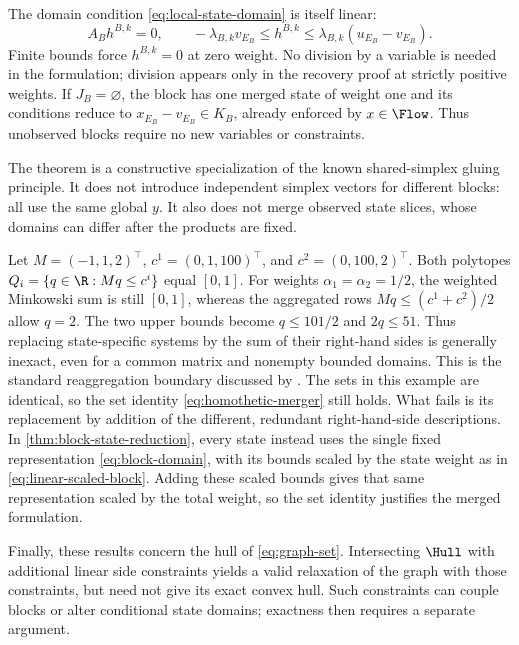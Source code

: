 The domain condition \eqref{eq:local-state-domain} is itself linear:
\begin{equation}\label{eq:linear-scaled-block}
 A_Bh^{B,k}=0,\qquad
 -\lambda_{B,k}v_{E_B}\le h^{B,k}
       \le\lambda_{B,k}(u_{E_B}-v_{E_B}).
\end{equation}
Finite bounds force $h^{B,k}=0$ at zero weight. No division by a variable is
needed in the formulation; division appears only in the recovery proof at
strictly positive weights. If $J_B=\varnothing$, the block has one merged
state of weight one and its conditions reduce to $x_{E_B}-v_{E_B}\in K_B$,
already enforced by $x\in\Flow$. Thus unobserved blocks require no new
variables or constraints.

The theorem is a constructive specialization of the known shared-simplex
gluing principle. It does not introduce independent simplex vectors for
different blocks: all use the same global $y$. It also does not merge
observed state slices, whose domains can differ after the products are fixed.

\begin{example}\label{ex:merger-boundary}
Let $M=(-1,1,2)^\top$, $c^1=(0,1,100)^\top$, and
$c^2=(0,100,2)^\top$. Both polytopes
$Q_i=\{q\in\R:Mq\le c^i\}$ equal $[0,1]$.
For weights $\alpha_1=\alpha_2=1/2$, the weighted Minkowski sum is still
$[0,1]$, whereas the aggregated rows
$Mq\le(c^1+c^2)/2$ allow $q=2$. The two upper bounds become
$q\le101/2$ and $2q\le51$. Thus replacing state-specific systems by
the sum of their right-hand sides is generally inexact, even for a common
matrix and nonempty bounded domains. This is the standard reaggregation
boundary discussed by \citet[Section~2, equation~(7)]{KisHorvath2022}.
The sets in this example are identical, so the set identity
\eqref{eq:homothetic-merger} still holds. What fails is its replacement by
addition of the different, redundant right-hand-side descriptions. In
\cref{thm:block-state-reduction}, every state instead uses the single fixed
representation \eqref{eq:block-domain}, with its bounds scaled by the state
weight as in \eqref{eq:linear-scaled-block}. Adding these scaled bounds gives
that same representation scaled by the total weight, so the set identity
justifies the merged formulation.
\end{example}

Finally, these results concern the hull of \eqref{eq:graph-set}. Intersecting
$\Hull$ with additional linear side constraints yields a valid relaxation
of the graph with those constraints, but need not give its exact convex
hull. Such constraints can couple blocks or alter conditional state domains;
exactness then requires a separate argument.
